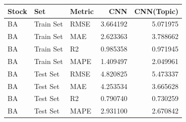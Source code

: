 \begin{tabular}{lllrr}
\toprule
Stock & Set & Metric & CNN & CNN(Topic) \\
\midrule
BA & Train Set & RMSE & 3.664192 & 5.071975 \\
BA & Train Set & MAE & 2.623363 & 3.788662 \\
BA & Train Set & R2 & 0.985358 & 0.971945 \\
BA & Train Set & MAPE & 1.409497 & 2.049961 \\
BA & Test Set & RMSE & 4.820825 & 5.473337 \\
BA & Test Set & MAE & 4.253534 & 3.665628 \\
BA & Test Set & R2 & 0.790740 & 0.730259 \\
BA & Test Set & MAPE & 2.931100 & 2.670842 \\
\bottomrule
\end{tabular}
